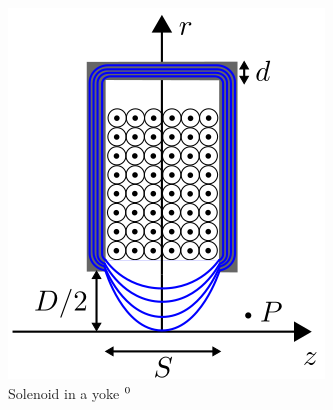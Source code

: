 \documentclass[10pt]{beamer}
\newcommand{\citesame}{$^{\thefootnote}$}
\begin{document}
\begin{frame}
\begin{columns}
\begin{column}{0.3\textwidth}
\begin{figure}
          \includegraphics[width=\textwidth]{yoke}
          \caption{Solenoid in a yoke \citesame}
        \end{figure}
    \end{column}
  \end{columns}


\end{frame}
\end{document}
